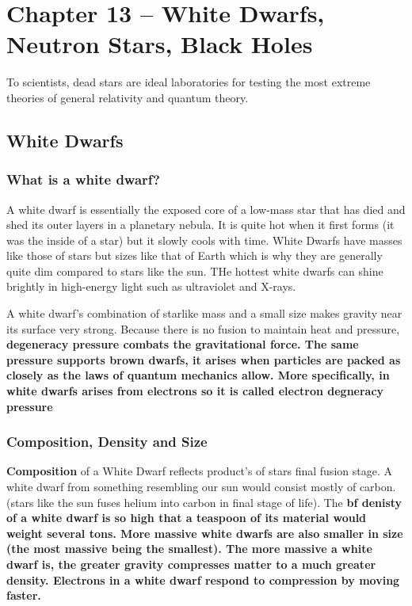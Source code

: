 \section{Chapter 13 -- White Dwarfs, Neutron Stars, Black Holes}
To scientists, dead stars are ideal laboratories for testing the most extreme theories of general relativity and quantum theory.

\subsection{White Dwarfs}
\subsubsection{What is a white dwarf?}
A white dwarf is essentially the exposed core of a low-mass star that has died and shed its outer layers in a planetary nebula. It is quite hot when it first forms (it was the inside of a star) but it slowly cools with time. White Dwarfs have masses like those of stars but sizes like that of Earth which is why they are generally quite dim compared to stars like the sun. THe hottest white dwarfs can shine brightly in high-energy light such as ultraviolet and X-rays.

A white dwarf's combination of starlike mass and a small size makes gravity near its surface very strong. Because there is no fusion to maintain heat and pressure, \bf{degeneracy pressure} combats the gravitational force. The same pressure supports brown dwarfs, it arises when particles are packed as closely as the laws of quantum mechanics allow. More specifically, in white dwarfs arises from electrons so it is called \bf{electron degneracy pressure}

\subsubsection{Composition, Density and Size}
{\bf Composition} of a White Dwarf reflects product's of stars final fusion stage. A white dwarf from something resembling our sun would consist mostly of carbon. (stars like the sun fuses helium into carbon in final stage of life). The \bf{bf denisty} of a white dwarf is so high that a teaspoon of its material would weight several tons. More massive white dwarfs are also smaller in size (the most massive being the smallest). The more massive a white dwarf is, the greater gravity compresses matter to a much greater density. Electrons in a white dwarf respond to compression by moving faster.


